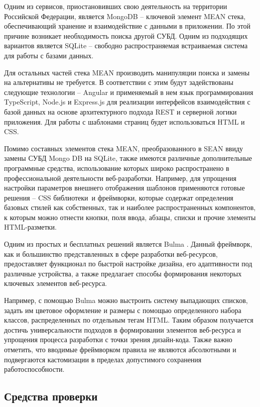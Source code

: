 Одним из сервисов, приостановивших свою деятельность на территории Российской Федерации, является MongoDB -- ключевой элемент MEAN стека, обеспечивающий хранение и взаимодействие с данными в приложении.
По этой причине возникает необходимость поиска другой СУБД.
Одним из подходящих вариантов является SQLite -- свободно распространяемая встраиваемая система для работы с базами данных.

Для остальных частей стека MEAN производить манипуляции поиска и замены на альтернативы не требуется.
В соответствии с этим будут задействованы следующие технологии -- Angular и применяемый в нем язык программирования TypeScript, Node.js и Express.js для реализации интерфейсов взаимодействия с базой данных на основе архитектурного подхода REST и серверной логики приложения.
Для работы с шаблонами страниц будет использоваться HTML и CSS.

Помимо составных элементов стека MEAN, преобразованного в SEAN ввиду замены СУБД Mongo DB на SQLite, также имеются различные дополнительные программные средства, использование которых широко распространено в профессиональной деятельности веб-разработки.
Например, для упрощения настройки параметров внешнего отображения шаблонов применяются готовые решения -- CSS библиотеки и фреймворки, которые содержат определения базовых стилей как собственных, так и наиболее распространенных компонентов, к которым можно отнести кнопки, поля ввода, абзацы, списки и прочие элементы HTML-разметки.

Одним из простых и бесплатных решений является Bulma \cite{bulma}.
Данный фреймворк, как и большинство представленных в сфере разработки веб-ресурсов, предоставляет функционал по быстрой настройке дизайна, его адаптивности под различные устройства, а также предлагает способы формирования некоторых ключевых элементов веб-ресурса.

Например, с помощью Bulma можно выстроить систему выпадающих списков, задать им цветовое оформление и размеры с помощью определенного набора классов, распределенных по отдельным тегам HTML.
Таким образом получается достичь универсальности подходов в формировании элементов веб-ресурса и упрощения процесса разработки с точки зрения дизайн-кода.
Также важно отметить, что вводимые фреймворком правила не являются абсолютными и подвергаются кастомизации в пределах допустимого сохранения работоспособности.

\subsection{Средства проверки}\label{средства-проверки}

